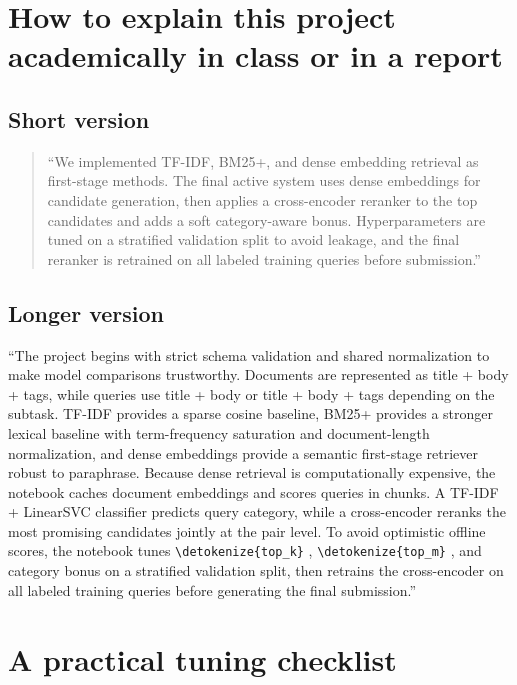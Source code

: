 \documentclass[10pt]{article}
\DeclareRobustCommand{\code}[1]{%
  \ifmmode
    \text{\nolinkurl{\detokenize{#1}}}%
  \else
    \nolinkurl{\detokenize{#1}}%
  \fi
}
\begin{document}
\section{How to explain this project academically in class or in a report}

\subsection{Short version}

\begin{quote}
``We implemented TF-IDF, BM25+, and dense embedding retrieval as first-stage methods. The final active system uses dense embeddings for candidate generation, then applies a cross-encoder reranker to the top candidates and adds a soft category-aware bonus. Hyperparameters are tuned on a stratified validation split to avoid leakage, and the final reranker is retrained on all labeled training queries before submission.''
\end{quote}

\subsection{Longer version}

``The project begins with strict schema validation and shared normalization to make model comparisons trustworthy. Documents are represented as title + body + tags, while queries use title + body or title + body + tags depending on the subtask. TF-IDF provides a sparse cosine baseline, BM25+ provides a stronger lexical baseline with term-frequency saturation and document-length normalization, and dense embeddings provide a semantic first-stage retriever robust to paraphrase. Because dense retrieval is computationally expensive, the notebook caches document embeddings and scores queries in chunks. A TF-IDF + LinearSVC classifier predicts query category, while a cross-encoder reranks the most promising candidates jointly at the pair level. To avoid optimistic offline scores, the notebook tunes \code{top_k}, \code{top_m}, and category bonus on a stratified validation split, then retrains the cross-encoder on all labeled training queries before generating the final submission.''

\section{A practical tuning checklist}
\end{document}

